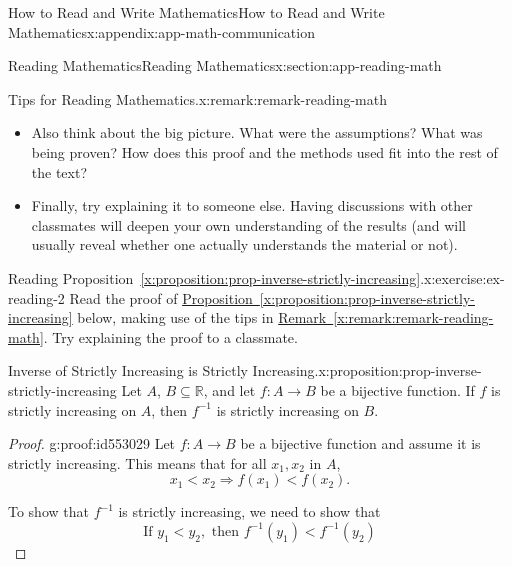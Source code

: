 \documentclass[oneside,10pt,]{book}
\newcommand{\xreffont}{\relax}
\numberwithin{equation}{section}
\newcommand{\lt}{<}
\begin{document}
\begin{appendixptx}{How to Read and Write Mathematics}{}{How to Read and Write Mathematics}{}{}{x:appendix:app-math-communication}
\begin{sectionptx}{Reading Mathematics}{}{Reading Mathematics}{}{}{x:section:app-reading-math}
\begin{remark}{Tips for Reading Mathematics.}{x:remark:remark-reading-math}
\begin{itemize}[label=\textbullet]
\begin{itemize}[label=$\circ$]
\item{}Can I simplify the idea to make it more understandable?%
\item{}Can I come up with my own examples based on this definition or property?%
\item{}Why did the author choose this way of explaining it?%
\item{}and so on\textellipsis{}%
\end{itemize}
%
\item{}Also think about the big picture. What were the assumptions? What was being proven? How does this proof and the methods used fit into the rest of the text?%
\item{}Finally, try explaining it to someone else. Having discussions with other classmates will deepen your own understanding of the results (and will usually reveal whether one actually understands the material or not).%
\end{itemize}
%
\end{remark}
\begin{inlineexercise}{Reading Proposition~{\xreffont\ref*{x:proposition:prop-inverse-strictly-increasing}}.}{x:exercise:ex-reading-2}%
Read the proof of \hyperref[x:proposition:prop-inverse-strictly-increasing]{Proposition~{\xreffont\ref{x:proposition:prop-inverse-strictly-increasing}}} below, making use of the tips in \hyperref[x:remark:remark-reading-math]{Remark~{\xreffont\ref{x:remark:remark-reading-math}}}. Try explaining the proof to a classmate.%
\end{inlineexercise}%
\begin{proposition}{Inverse of Strictly Increasing is Strictly Increasing.}{}{x:proposition:prop-inverse-strictly-increasing}%
Let \(A\), \(B \subseteq \mathbb{R}\), and let \(f:A \rightarrow B\) be a bijective function. If \(f\) is strictly increasing on \(A\), then \(f^{-1}\) is strictly increasing on \(B\).%
\end{proposition}
\begin{proof}{}{g:proof:id553029}
Let \(f: A \rightarrow B\) be a bijective function and assume it is strictly increasing. This means that for all \(x_1,x_2\) in \(A\),%
\begin{equation*}
x_1 \lt x_2 \Rightarrow f(x_1) \lt f(x_2)\text{.}
\end{equation*}
%
\par
 To show that \(f^{-1}\) is strictly increasing, we need to show that%
\begin{equation*}
\text{If } y_1 \lt y_2, \text{ then } f^{-1}(y_1) \lt f^{-1}(y_2)

\end{equation*}
\end{proof}
\end{sectionptx}
\end{appendixptx}
\end{document}
